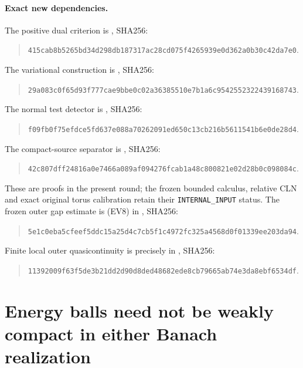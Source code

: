\documentclass[11pt,a4paper]{article}
\numberwithin{equation}{section}
\theoremstyle{definition}
\theoremstyle{remark}
\begin{document}
\paragraph{Exact new dependencies.}
The positive dual criterion is
, SHA256:
\begin{quote}\small
\nolinkurl{415cab8b5265bd34d298db187317ac28cd075f4265939e0d362a0b30c42da7e0}.
\end{quote}
The variational construction is
, SHA256:
\begin{quote}\small
\nolinkurl{29a083c0f65d93f777cae9bbe0c02a36385510e7b1a6c9542552322439168743}.
\end{quote}
The normal test detector is
, SHA256:
\begin{quote}\small
\nolinkurl{f09fb0f75efdce5fd637e088a70262091ed650c13cb216b5611541b6e0de28d4}.
\end{quote}
The compact-source separator is
, SHA256:
\begin{quote}\small
\nolinkurl{42c807dff24816a0e7466a089af094276fcab1a48c800821e02d28b0c098084c}.
\end{quote}
These are proofs in the present round; the frozen bounded calculus,
relative CLN and exact original torus calibration retain their
\texttt{INTERNAL\_INPUT} status.
The frozen outer gap estimate is (EV8) in
,
SHA256:
\begin{quote}\small
\nolinkurl{5e1c0eba5cfeef5ddc15a25d4c7cb5f1c4972fc325a4568d0f01339ee203da94}.
\end{quote}
Finite local outer quasicontinuity is precisely
 in
,
SHA256:
\begin{quote}\small
\nolinkurl{11392009f63f5de3b21dd2d90d8ded48682ede8cb79665ab74e3da8ebf6534df}.
\end{quote}



\section{Energy balls need not be weakly compact in either Banach realization}
\label{sec:r12-energy-ball-weak-compactness-obstruction}
\end{document}
